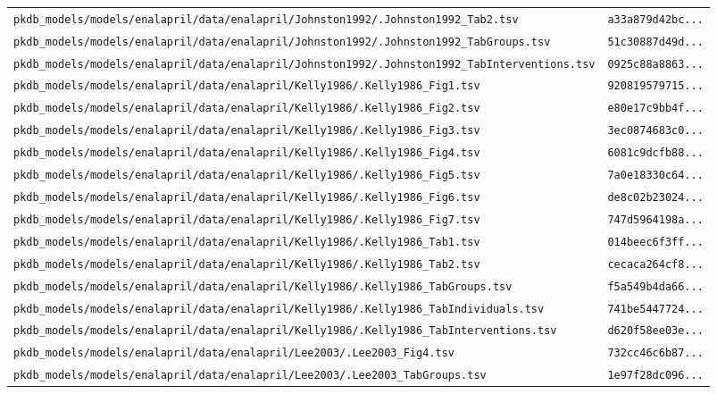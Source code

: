 \begin{longtable}{ll}
\texttt{pkdb\_models/models/enalapril/data/enalapril/Johnston1992/.Johnston1992\_Tab2.tsv} & \texttt{a33a879d42bc...} \\
\texttt{pkdb\_models/models/enalapril/data/enalapril/Johnston1992/.Johnston1992\_TabGroups.tsv} & \texttt{51c30887d49d...} \\
\texttt{pkdb\_models/models/enalapril/data/enalapril/Johnston1992/.Johnston1992\_TabInterventions.tsv} & \texttt{0925c88a8863...} \\
\texttt{pkdb\_models/models/enalapril/data/enalapril/Kelly1986/.Kelly1986\_Fig1.tsv} & \texttt{920819579715...} \\
\texttt{pkdb\_models/models/enalapril/data/enalapril/Kelly1986/.Kelly1986\_Fig2.tsv} & \texttt{e80e17c9bb4f...} \\
\texttt{pkdb\_models/models/enalapril/data/enalapril/Kelly1986/.Kelly1986\_Fig3.tsv} & \texttt{3ec0874683c0...} \\
\texttt{pkdb\_models/models/enalapril/data/enalapril/Kelly1986/.Kelly1986\_Fig4.tsv} & \texttt{6081c9dcfb88...} \\
\texttt{pkdb\_models/models/enalapril/data/enalapril/Kelly1986/.Kelly1986\_Fig5.tsv} & \texttt{7a0e18330c64...} \\
\texttt{pkdb\_models/models/enalapril/data/enalapril/Kelly1986/.Kelly1986\_Fig6.tsv} & \texttt{de8c02b23024...} \\
\texttt{pkdb\_models/models/enalapril/data/enalapril/Kelly1986/.Kelly1986\_Fig7.tsv} & \texttt{747d5964198a...} \\
\texttt{pkdb\_models/models/enalapril/data/enalapril/Kelly1986/.Kelly1986\_Tab1.tsv} & \texttt{014beec6f3ff...} \\
\texttt{pkdb\_models/models/enalapril/data/enalapril/Kelly1986/.Kelly1986\_Tab2.tsv} & \texttt{cecaca264cf8...} \\
\texttt{pkdb\_models/models/enalapril/data/enalapril/Kelly1986/.Kelly1986\_TabGroups.tsv} & \texttt{f5a549b4da66...} \\
\texttt{pkdb\_models/models/enalapril/data/enalapril/Kelly1986/.Kelly1986\_TabIndividuals.tsv} & \texttt{741be5447724...} \\
\texttt{pkdb\_models/models/enalapril/data/enalapril/Kelly1986/.Kelly1986\_TabInterventions.tsv} & \texttt{d620f58ee03e...} \\
\texttt{pkdb\_models/models/enalapril/data/enalapril/Lee2003/.Lee2003\_Fig4.tsv} & \texttt{732cc46c6b87...} \\
\texttt{pkdb\_models/models/enalapril/data/enalapril/Lee2003/.Lee2003\_TabGroups.tsv} & \texttt{1e97f28dc096...} \\

\end{longtable}
